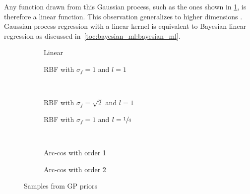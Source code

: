 Any function drawn from this Gaussian process, such as the ones shown in \cref{fig:gp:gp_samples:linear}, is therefore a linear function.
This observation generalizes to higher dimensions \cite{rasmussen_gaussian_2006}.
Gaussian process regression with a linear kernel is equivalent to Bayesian linear regression as discussed in~\cref{toc:bayesian_ml:bayesian_ml}.
\begin{figure}[p]
    \begin{subfigure}[b]{\halffigurewidth}
        \centering
        \caption{
            Linear
            \label{fig:gp:gp_samples:linear}
        }
    \end{subfigure}
    \hfill
    \begin{subfigure}[b]{\halffigurewidth}
        \centering
        \caption{
            RBF with $\sigma_f = 1$ and $l=1$
            \label{fig:gp:gp_samples:rbf_normal}
        }
    \end{subfigure}\\[\figureskip]
    \begin{subfigure}[b]{\halffigurewidth}
        \centering
        \caption{
            RBF with $\sigma_f = \sqrt{2}$ and $l=1$
            \label{fig:gp:gp_samples:rbf_noisy}
        }
    \end{subfigure}
    \hfill
    \begin{subfigure}[b]{\halffigurewidth}
        \centering
        \caption{
            RBF with $\sigma_f = 1$ and $l = \sfrac{1}{4}$
            \label{fig:gp:gp_samples:rbf_lengthscale}
        }
    \end{subfigure}\\[\figureskip]
    \begin{subfigure}[b]{\halffigurewidth}
        \centering
        \caption{
            Arc-cos with order 1
            \label{fig:gp:gp_samples:arccos:1}
        }
    \end{subfigure}
    \hfill
    \begin{subfigure}[b]{\halffigurewidth}
        \centering
        \caption{
            Arc-cos with order 2
            \label{fig:gp:gp_samples:arccos:2}
        }
    \end{subfigure}
    \caption[Samples from GP priors]{
        Samples from GP priors
        \label{fig:gp:gp_samples}
    }
\end{figure}

